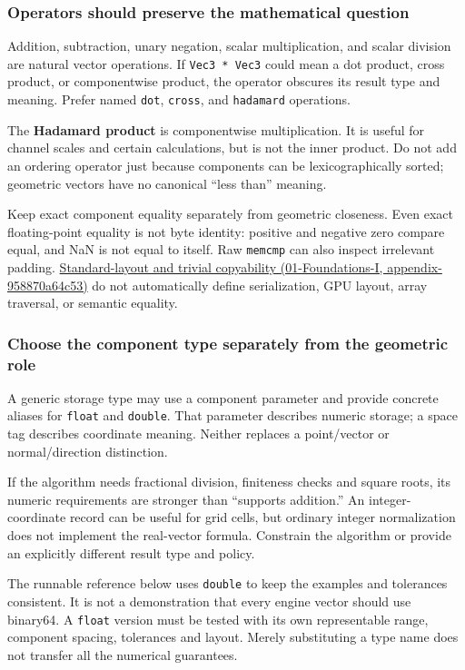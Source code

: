 \subsubsection{Operators should preserve the mathematical question}\label{operators-should-preserve-the-mathematical-question}

Addition, subtraction, unary negation, scalar multiplication, and scalar division are natural vector operations. If \texttt{Vec3\ *\ Vec3} could mean a dot product, cross product, or componentwise product, the operator obscures its result type and meaning. Prefer named \texttt{dot}, \texttt{cross}, and \texttt{hadamard} operations.

The \textbf{Hadamard product} is componentwise multiplication. It is useful for channel scales and certain calculations, but is not the inner product. Do not add an ordering operator just because components can be lexicographically sorted; geometric vectors have no canonical ``less than'' meaning.

Keep exact component equality separately from geometric closeness. Even exact floating-point equality is not byte identity: positive and negative zero compare equal, and NaN is not equal to itself. Raw \texttt{memcmp} can also inspect irrelevant padding. \href{}{Standard-layout and trivial copyability (01-Foundations-I, appendix-958870a64c53)} do not automatically define serialization, GPU layout, array traversal, or semantic equality.

\subsubsection{Choose the component type separately from the geometric role}\label{choose-the-component-type-separately-from-the-geometric-role}

A generic storage type may use a component parameter and provide concrete aliases for \texttt{float} and \texttt{double}. That parameter describes numeric storage; a space tag describes coordinate meaning. Neither replaces a point/vector or normal/direction distinction.

If the algorithm needs fractional division, finiteness checks and square roots, its numeric requirements are stronger than ``supports addition.'' An integer-coordinate record can be useful for grid cells, but ordinary integer normalization does not implement the real-vector formula. Constrain the algorithm or provide an explicitly different result type and policy.

The runnable reference below uses \texttt{double} to keep the examples and tolerances consistent. It is not a demonstration that every engine vector should use binary64. A \texttt{float} version must be tested with its own representable range, component spacing, tolerances and layout. Merely substituting a type name does not transfer all the numerical guarantees.

